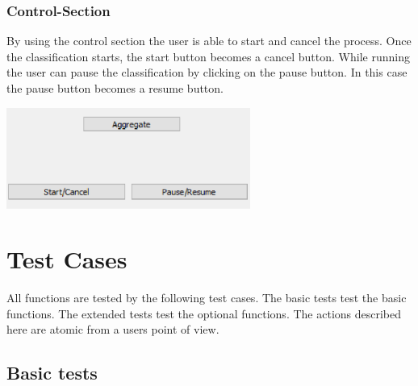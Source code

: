\documentclass[parskip=full]{scrartcl}
\begin{document}
\subsubsection {Control-Section}

By using the control section the user is able to start and cancel the process. Once the classification starts, the start button becomes a cancel button. While running the user can pause the classification by clicking on the pause button. In this case the pause button becomes a resume button.

\begin{center}
\includegraphics[width=0.6\textwidth]{images/NewMainWindowControl.png}
\end{center}

\pagebreak





\section {Test Cases}

All functions are tested by the following test cases. The basic tests test the basic functions. The extended tests test the optional functions. The actions described here are atomic from a users point of view.

\subsection {Basic tests}
\end{document}
